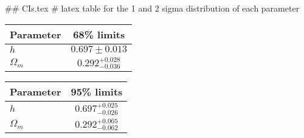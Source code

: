 ## CIs.tex
# latex table for the 1 and 2 sigma distribution of each parameter

\begin{tabular} { l  c}
 Parameter &  68\% limits\\
\hline
{\boldmath$h              $} & $0.697\pm 0.013            $\\
{\boldmath$\Omega_m       $} & $0.292^{+0.028}_{-0.036}   $\\
\hline
\end{tabular}

\begin{tabular} { l  c}
 Parameter &  95\% limits\\
\hline
{\boldmath$h              $} & $0.697^{+0.025}_{-0.026}   $\\
{\boldmath$\Omega_m       $} & $0.292^{+0.065}_{-0.062}   $\\
\hline
\end{tabular}

